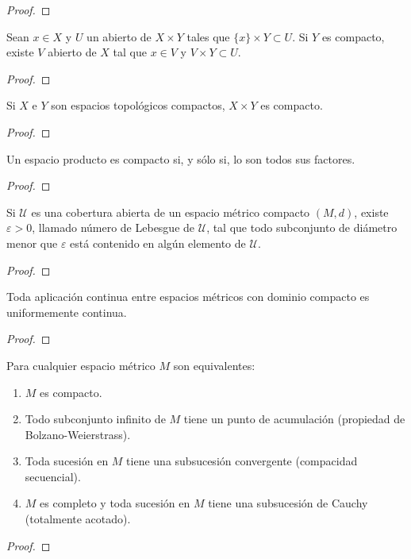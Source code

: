 \begin{proof}
\end{proof}
\begin{lema}
    Sean $x \in X$ y $U$ un abierto de $X \times Y$ tales que $\{x\} \times Y \subset U$. Si $Y$ es compacto, existe $V$ abierto de $X$ tal que $x \in V$ y $V \times Y \subset U$.
\end{lema}
\begin{proof}
\end{proof}
\begin{proposición}
    Si $X$ e $Y$ son espacios topológicos compactos, $X \times Y$ es compacto.
\end{proposición}
\begin{proof}
\end{proof}
\begin{teorema}
    Un espacio producto es compacto si, y sólo si, lo son todos sus factores.
\end{teorema}
\begin{proof}
\end{proof}
\begin{lema}
    Si $\mathcal{U}$ es una cobertura abierta de un espacio métrico compacto $(M, d)$, existe $\varepsilon > 0$, llamado número de Lebesgue de $\mathcal{U}$, tal que todo subconjunto de diámetro menor que $\varepsilon$ está contenido en algún elemento de $\mathcal{U}$.
\end{lema}
\begin{proof}
\end{proof}
\begin{proposición}
    Toda aplicación continua entre espacios métricos con dominio compacto es uniformemente continua.
\end{proposición}
\begin{proof}
\end{proof}
\begin{teorema}
    Para cualquier espacio métrico $M$ son equivalentes:
    \begin{enumerate}
        \item $M$ es compacto.
        \item Todo subconjunto infinito de $M$ tiene un punto de acumulación (propiedad de Bolzano-Weierstrass).
        \item Toda sucesión en $M$ tiene una subsucesión convergente (compacidad secuencial).
        \item $M$ es completo y toda sucesión en $M$ tiene una subsucesión de Cauchy (totalmente acotado).
    \end{enumerate}
\end{teorema}
\begin{proof}
\end{proof}

